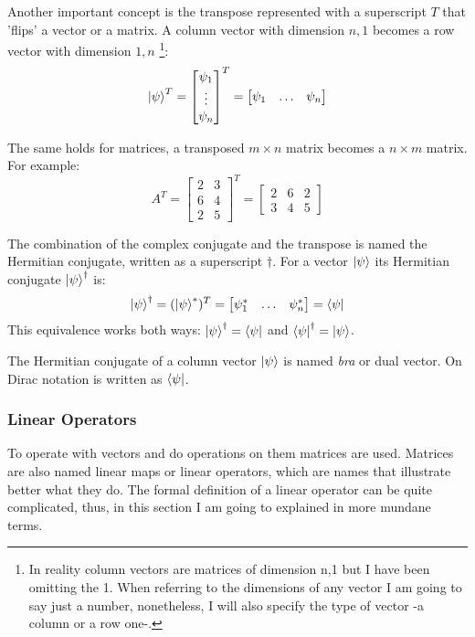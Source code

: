 Another important concept is the transpose represented with a superscript $T$ that 'flips' a vector or a matrix. A column vector with dimension $n,1$ becomes a row vector with dimension $1,n$ \footnote{In reality column vectors are matrices of dimension n,1 but I have been omitting the 1. When referring to the dimensions of any vector I am going to say just a number, nonetheless, I will also specify the type of vector -a column or a row one-.}:
$$
\ket{\psi}^{T} = 
	\begin{bmatrix} \psi_{1} \\ \vdots \\ \psi_{n} \end{bmatrix}^T = \begin{bmatrix} \psi_{1} & \dots & \psi_{n} \end{bmatrix}
$$

The same holds for matrices, a transposed $m\times n$ matrix becomes a $n \times m$ matrix. For example:
$$
A^T = \begin{bmatrix}
	 2 & 3 \\
	 6 & 4 \\
	 2 & 5 
\end{bmatrix}^T = \begin{bmatrix}
 2 & 6 & 2 \\
 3 & 4 & 5
\end{bmatrix}
$$

The combination of the complex conjugate and the transpose is named the Hermitian conjugate, written as a superscript $\dagger$. For a vector $\ket{\psi}$ its Hermitian conjugate $\ket{\psi}^\dagger$ is:
$$
\ket{\psi}^\dagger = (\ket{\psi}^*)^T =  \begin{bmatrix} \psi_{1}^* & \dots & \psi_{n}^* \end{bmatrix} = \bra{\psi}
$$
This equivalence works both ways: $\ket{\psi}^\dagger = \bra{\psi}$ and $\bra{\psi}^\dagger = \ket{\psi}$.

The Hermitian conjugate of a column vector $\ket{\psi}$ is named \textit{bra} or dual vector. On Dirac notation is written as $\bra{\psi}$. 

\subsubsection{Linear Operators}
To operate with vectors and do operations on them matrices are used. Matrices are also named linear maps or linear operators, which are names that illustrate better what they do. The formal definition of a linear operator can be quite complicated, thus, in this section I am going to explained in more mundane terms.

